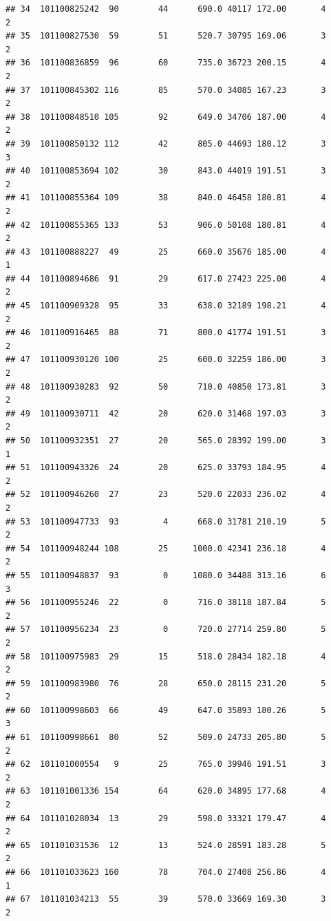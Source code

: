 \documentclass[
]{article}
\begin{document}
\begin{verbatim}
## 34  101100825242  90        44      690.0 40117 172.00       4          2
## 35  101100827530  59        51      520.7 30795 169.06       3          2
## 36  101100836859  96        60      735.0 36723 200.15       4          2
## 37  101100845302 116        85      570.0 34085 167.23       3          2
## 38  101100848510 105        92      649.0 34706 187.00       4          2
## 39  101100850132 112        42      805.0 44693 180.12       3          3
## 40  101100853694 102        30      843.0 44019 191.51       3          2
## 41  101100855364 109        38      840.0 46458 180.81       4          2
## 42  101100855365 133        53      906.0 50108 180.81       4          2
## 43  101100888227  49        25      660.0 35676 185.00       4          1
## 44  101100894686  91        29      617.0 27423 225.00       4          2
## 45  101100909328  95        33      638.0 32189 198.21       4          2
## 46  101100916465  88        71      800.0 41774 191.51       3          2
## 47  101100930120 100        25      600.0 32259 186.00       3          2
## 48  101100930283  92        50      710.0 40850 173.81       3          2
## 49  101100930711  42        20      620.0 31468 197.03       3          2
## 50  101100932351  27        20      565.0 28392 199.00       3          1
## 51  101100943326  24        20      625.0 33793 184.95       4          2
## 52  101100946260  27        23      520.0 22033 236.02       4          2
## 53  101100947733  93         4      668.0 31781 210.19       5          2
## 54  101100948244 108        25     1000.0 42341 236.18       4          2
## 55  101100948837  93         0     1080.0 34488 313.16       6          3
## 56  101100955246  22         0      716.0 38118 187.84       5          2
## 57  101100956234  23         0      720.0 27714 259.80       5          2
## 58  101100975983  29        15      518.0 28434 182.18       4          2
## 59  101100983980  76        28      650.0 28115 231.20       5          2
## 60  101100998603  66        49      647.0 35893 180.26       5          3
## 61  101100998661  80        52      509.0 24733 205.80       5          2
## 62  101101000554   9        25      765.0 39946 191.51       3          2
## 63  101101001336 154        64      620.0 34895 177.68       4          2
## 64  101101028034  13        29      598.0 33321 179.47       4          2
## 65  101101031536  12        13      524.0 28591 183.28       5          2
## 66  101101033623 160        78      704.0 27408 256.86       4          1
## 67  101101034213  55        39      570.0 33669 169.30       3          2

\end{verbatim}
\end{document}
